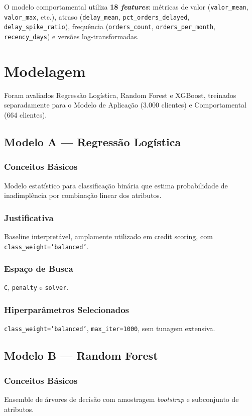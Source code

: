 \documentclass[conference]{IEEEtran}
\newcommand{\code}[1]{\texttt{#1}}
\begin{document}
O modelo comportamental utiliza \textbf{18 \textit{features}}: métricas de valor (\code{valor\_mean}, \code{valor\_max}, etc.), atraso (\code{delay\_mean}, \code{pct\_orders\_delayed}, \code{delay\_spike\_ratio}), frequência (\code{orders\_count}, \code{orders\_per\_month}, \code{recency\_days}) e versões log-transformadas.

\section{Modelagem}

Foram avaliados Regressão Logística, Random Forest e XGBoost, treinados separadamente para o Modelo de Aplicação (3.000 clientes) e Comportamental (664 clientes).

\subsection{Modelo A --- Regressão Logística}

\subsubsection{Conceitos Básicos}
Modelo estatístico para classificação binária que estima probabilidade de inadimplência por combinação linear dos atributos.

\subsubsection{Justificativa}
Baseline interpretável, amplamente utilizado em credit scoring, com \code{class\_weight='balanced'}.

\subsubsection{Espaço de Busca}
\code{C}, \code{penalty} e \code{solver}.

\subsubsection{Hiperparâmetros Selecionados}
\code{class\_weight='balanced'}, \code{max\_iter=1000}, sem tunagem extensiva.

\subsection{Modelo B --- Random Forest}

\subsubsection{Conceitos Básicos}
Ensemble de árvores de decisão com amostragem \textit{bootstrap} e subconjunto de atributos.
\end{document}
